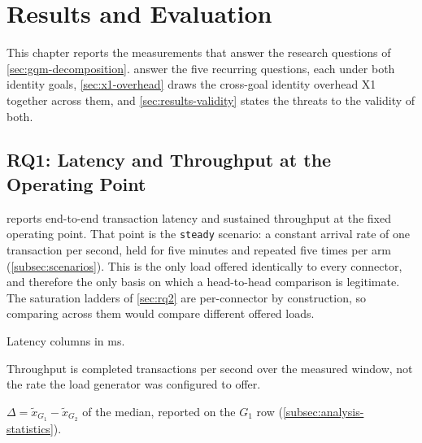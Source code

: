 \chapter{Results and Evaluation}\label{chap:results-evaluation}

This chapter reports the measurements that answer the research questions of \cref{sec:gqm-decomposition}.  answer the five recurring questions, each under both identity goals, \cref{sec:x1-overhead} draws the cross-goal identity overhead X1 together across them, and \cref{sec:results-validity} states the threats to the validity of both.

\section{RQ1: Latency and Throughput at the Operating Point}\label{sec:rq1}

 reports end-to-end transaction latency and sustained throughput at the fixed operating point. That point is the \texttt{steady} scenario: a constant arrival rate of one transaction per second, held for five minutes and repeated five times per arm (\cref{subsec:scenarios}). This is the only load offered identically to every connector, and therefore the only basis on which a head-to-head comparison is legitimate. The saturation ladders of \cref{sec:rq2} are per-connector by construction, so comparing across them would compare different offered loads.

\begin{table}[H]
    \centering
    \begin{threeparttable}
    \small
    \setlength{\tabcolsep}{4pt}
    
    \begin{tablenotes}\footnotesize
        \item Latency columns in ms. 
        \item Throughput is completed transactions per second over the measured window, not the rate the load generator was configured to offer.
        \item $\Delta = \tilde{x}_{G_1} - \tilde{x}_{G_2}$ of the median, reported on the $G_1$ row (\cref{subsec:analysis-statistics}).
    \end{tablenotes}
    \end{threeparttable}
    \caption[Operating-point latency and throughput]{End-to-end latency and sustained throughput at the operating point, by connector and identity goal.}
    \label{tab:rq1-steady}
\end{table}

